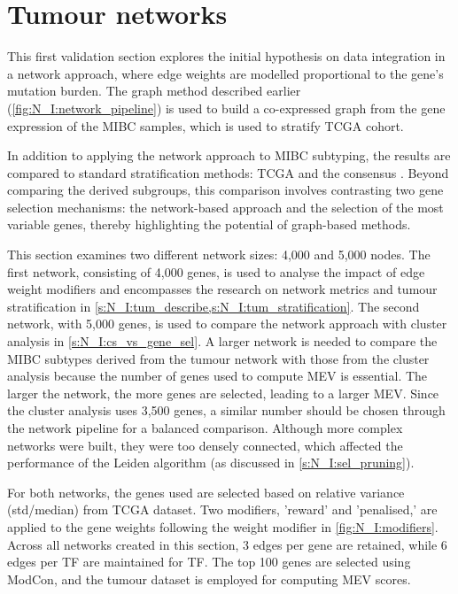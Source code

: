 \section{Tumour networks} \label{s:N_I:tum}


This first validation section explores the initial hypothesis on data integration in a network approach, where edge weights are modelled proportional to the gene's mutation burden. The graph method described earlier (\cref{fig:N_I:network_pipeline}) is used to build a co-expressed graph from the gene expression of the MIBC samples, which is used to stratify TCGA cohort.

In addition to applying the network approach to MIBC subtyping, the results are compared to standard stratification methods: TCGA \citep{Robertson2017-mg} and the consensus \citep{Kamoun2020-tj}. Beyond comparing the derived subgroups, this comparison involves contrasting two gene selection mechanisms: the network-based approach and the selection of the most variable genes, thereby highlighting the potential of graph-based methods.

This section examines two different network sizes: 4,000 and 5,000 nodes. The first network, consisting of 4,000 genes, is used to analyse the impact of edge weight modifiers and encompasses the research on network metrics and tumour stratification in \cref{s:N_I:tum_describe,s:N_I:tum_stratification}. The second network, with 5,000 genes, is used to compare the network approach with cluster analysis in \cref{s:N_I:cs_vs_gene_sel}. A larger network is needed to compare the MIBC subtypes derived from the tumour network with those from the cluster analysis because the number of genes used to compute MEV is essential. The larger the network, the more genes are selected, leading to a larger MEV. Since the cluster analysis uses 3,500 genes, a similar number should be chosen through the network pipeline for a balanced comparison. Although more complex networks were built, they were too densely connected, which affected the performance of the Leiden algorithm (as discussed in \cref{s:N_I:sel_pruning}).

For both networks, the genes used are selected based on relative variance (std/median) from TCGA dataset. Two modifiers, 'reward' and 'penalised,' are applied to the gene weights following the weight modifier in \cref{fig:N_I:modifiers}. Across all networks created in this section, 3 edges per gene are retained, while 6 edges per TF are maintained for TF. The top 100 genes are selected using ModCon, and the tumour dataset is employed for computing MEV scores.

